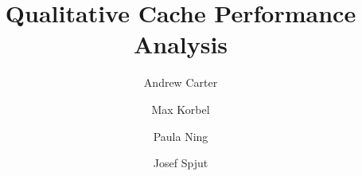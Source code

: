 \documentclass[pageno]{jpaper}
\begin{document}
\title{Qualitative Cache Performance Analysis}

\author{Andrew Carter \and Max Korbel \and Paula Ning \and Josef Spjut}
\date{}
\maketitle


\begin{abstract}

\end{abstract}











\end{document}
